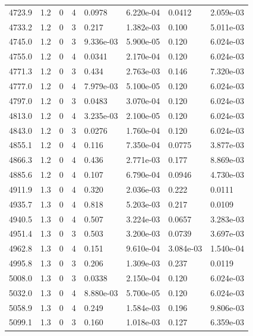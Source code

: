 \documentclass[preview]{standalone}
\begin{document}
{{{{{{{{\begin{tabular}{L{1.2cm}C{1.2cm} C{0.3cm}C{0.5cm} C{1.4cm}C{1.4cm} C{1.4cm}C{1.4cm}}
  4723.9  &   1.2  & 0     &  4 &  0.0978  & 6.220e-04  & 0.0412 &  2.059e-03   \\ 
  4733.2  &   1.2  & 0     &  3 &  0.217  & 1.382e-03  & 0.100 &  5.011e-03   \\ 
  4745.0  &   1.2  & 0     &  3 &  9.336e-03  & 5.900e-05  & 0.120 &  6.024e-03   \\ 
  4755.0  &   1.2  & 0     &  4 &  0.0341  & 2.170e-04  & 0.120 &  6.024e-03   \\ 
  4771.3  &   1.2  & 0     &  3 &  0.434  & 2.763e-03  & 0.146 &  7.320e-03   \\ 
  4777.0  &   1.2  & 0     &  4 &  7.979e-03  & 5.100e-05  & 0.120 &  6.024e-03   \\ 
  4797.0  &   1.2  & 0     &  3 &  0.0483  & 3.070e-04  & 0.120 &  6.024e-03   \\ 
  4813.0  &   1.2  & 0     &  4 &  3.235e-03  & 2.100e-05  & 0.120 &  6.024e-03   \\ 
  4843.0  &   1.2  & 0     &  3 &  0.0276  & 1.760e-04  & 0.120 &  6.024e-03   \\ 
  4855.1  &   1.2  & 0     &  4 &  0.116  & 7.350e-04  & 0.0775 &  3.877e-03   \\ 
  4866.3  &   1.2  & 0     &  4 &  0.436  & 2.771e-03  & 0.177 &  8.869e-03   \\ 
  4885.6  &   1.2  & 0     &  4 &  0.107  & 6.790e-04  & 0.0946 &  4.730e-03   \\ 
  4911.9  &   1.3  & 0     &  4 &  0.320  & 2.036e-03  & 0.222 &  0.0111   \\ 
  4935.7  &   1.3  & 0     &  4 &  0.818  & 5.203e-03  & 0.217 &  0.0109   \\ 
  4940.5  &   1.3  & 0     &  4 &  0.507  & 3.224e-03  & 0.0657 &  3.283e-03   \\ 
  4951.4  &   1.3  & 0     &  3 &  0.503  & 3.200e-03  & 0.0739 &  3.697e-03   \\ 
  4962.8  &   1.3  & 0     &  4 &  0.151  & 9.610e-04  & 3.084e-03 &  1.540e-04   \\ 
  4995.8  &   1.3  & 0     &  3 &  0.206  & 1.309e-03  & 0.237 &  0.0119   \\ 
  5008.0  &   1.3  & 0     &  3 &  0.0338  & 2.150e-04  & 0.120 &  6.024e-03   \\ 
  5032.0  &   1.3  & 0     &  4 &  8.880e-03  & 5.700e-05  & 0.120 &  6.024e-03   \\ 
  5058.9  &   1.3  & 0     &  4 &  0.249  & 1.584e-03  & 0.196 &  9.806e-03   \\ 
  5099.1  &   1.3  & 0     &  3 &  0.160  & 1.018e-03  & 0.127 &  6.359e-03   \\ 

\end{tabular}}}}}}}}}
\end{document}
